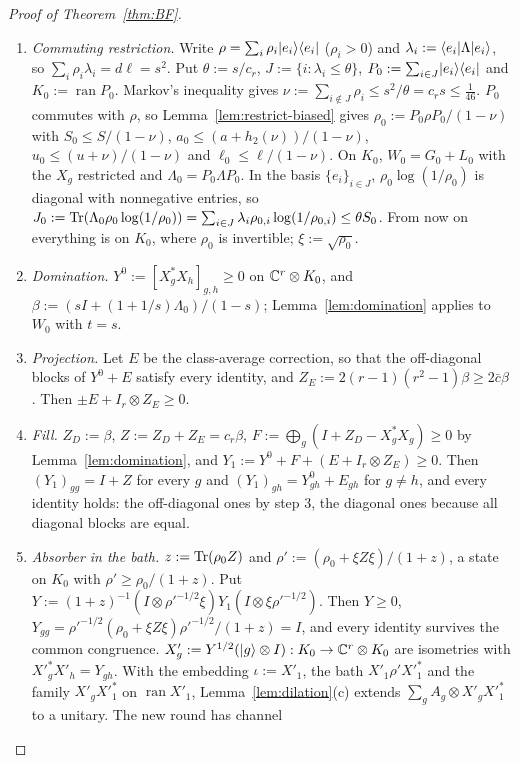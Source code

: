 \begin{proof}[Proof of Theorem~\ref{thm:BF}]
\begin{enumerate}[label=\arabic*.,itemsep=1pt]
\item \emph{Commuting restriction.} Write $\rho=\sum_i\rho_i\lvert e_i\rangle\langle e_i\rvert$ ($\rho_i>0$) and $\lambda_i:=\langle e_i\rvert\Lambda\lvert e_i\rangle$, so $\sum_i\rho_i\lambda_i=d\ell=s^2$. Put $\theta:=s/c_r$,
$J:=\{i:\lambda_i\le\theta\}$, $P_0:=\sum_{i\in J}\lvert e_i\rangle\langle e_i\rvert$ and $K_0:=\operatorname{ran}P_0$. Markov's inequality gives $\nu:=\sum_{i\notin J}\rho_i\le s^2/\theta=c_rs\le\frac1{46}$. $P_0$ commutes
with $\rho$, so Lemma~\ref{lem:restrict-biased} gives $\rho_0:=P_0\rho P_0/(1-\nu)$ with $S_0\le S/(1-\nu)$, $a_0\le(a+h_2(\nu))/(1-\nu)$, $u_0\le(u+\nu)/(1-\nu)$ and $\ell_0\le\ell/(1-\nu)$.
On $K_0$, $W_0=G_0+L_0$ with the $X_g$ restricted and $\Lambda_0=P_0\Lambda P_0$. In the basis $\{e_i\}_{i\in J}$, $\rho_0\log(1/\rho_0)$ is diagonal with nonnegative entries, so
$J_0:=\operatorname{Tr}(\Lambda_0\rho_0\log(1/\rho_0))=\sum_{i\in J}\lambda_i\rho_{0,i}\log(1/\rho_{0,i})\le\theta S_0$. From now on everything is on $K_0$, where $\rho_0$ is invertible; $\xi:=\sqrt{\rho_0}$.
\item \emph{Domination.} $Y^0:=[X_g^*X_h]_{g,h}\ge0$ on $\mathbb C^r\otimes K_0$, and $\beta:=(sI+(1+1/s)\Lambda_0)/(1-s)$; Lemma~\ref{lem:domination} applies to $W_0$ with $t=s$.
\item \emph{Projection.} Let $E$ be the class-average correction, so that the off-diagonal blocks of $Y^0+E$ satisfy every identity, and $Z_E:=2(r-1)(r^2-1)\beta\ge2\bar c\beta$. Then
$\pm E+I_r\otimes Z_E\ge0$.
\item \emph{Fill.} $Z_D:=\beta$, $Z:=Z_D+Z_E=c_r\beta$, $F:=\bigoplus_g(I+Z_D-X_g^*X_g)\ge0$ by Lemma~\ref{lem:domination}, and $Y_1:=Y^0+F+(E+I_r\otimes Z_E)\ge0$. Then $(Y_1)_{gg}=I+Z$
for every $g$ and $(Y_1)_{gh}=Y^0_{gh}+E_{gh}$ for $g\ne h$, and every identity holds: the off-diagonal ones by step 3, the diagonal ones because all diagonal blocks are equal.
\item \emph{Absorber in the bath.} $z:=\operatorname{Tr}(\rho_0Z)$ and $\rho':=(\rho_0+\xi Z\xi)/(1+z)$, a state on $K_0$ with $\rho'\ge\rho_0/(1+z)$. Put
$Y:=(1+z)^{-1}(I\otimes\rho'^{-1/2}\xi)Y_1(I\otimes\xi\rho'^{-1/2})$. Then $Y\ge0$, $Y_{gg}=\rho'^{-1/2}(\rho_0+\xi Z\xi)\rho'^{-1/2}/(1+z)=I$, and every identity survives the common
congruence. $X'_g:=Y^{1/2}(\lvert g\rangle\otimes I):K_0\to\mathbb C^r\otimes K_0$ are isometries with $X'^*_gX'_h=Y_{gh}$. With the embedding $\iota:=X'_1$, the bath $X'_1\rho'X'^*_1$ and the family
$X'_gX'^*_1$ on $\operatorname{ran}X'_1$, Lemma~\ref{lem:dilation}(c) extends $\sum_gA_g\otimes X'_gX'^*_1$ to a unitary. The new round has channel

\end{enumerate}
\end{proof}
